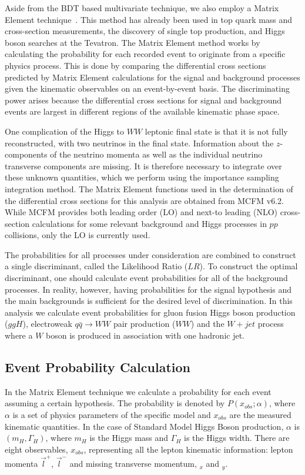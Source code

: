 Aside from the BDT based multivariate technique, we also employ a Matrix Element technique~\cite{MENote}. 
This method has already been used in top quark mass and cross-section 
measurements, the discovery of single top production, and Higgs boson searches at the Tevatron.  
The Matrix Element method works by calculating the probability for each recorded
event to originate from a specific physics process.
This is done by comparing the differential cross sections predicted by Matrix Element 
calculations for the signal and background processes given the kinematic observables
on an event-by-event basis.
The discriminating power arises because the differential cross sections for 
signal and background events are largest in different regions of the available
kinematic phase space. 

One complication of the Higgs to $WW$ leptonic final state is that it is not fully 
reconstructed, with two neutrinos in the final state. 
Information about the $z$-components of the neutrino momenta as well as the individual 
neutrino transverse components are missing. It is therefore necessary to integrate 
over these unknown quantities, which we perform using the importance sampling 
integration method.
The Matrix Element functions used in the determination of the differential cross sections
for this analysis are obtained from  MCFM v6.2.  While MCFM 
provides both leading order (LO) and next-to leading (NLO) cross-section calculations for 
some relevant background and Higgs processes in $pp$ collisions, only the
LO is currently used.

The probabilities for all processes under consideration are combined 
to construct a single discriminant, called the Likelihood Ratio ($LR$).  
To construct the optimal discriminant, one should calculate 
event probabilities for all of the background processes. In reality, however, having 
probabilities for the signal hypothesis and the main backgrounds is sufficient for the 
desired level of discrimination. In this analysis we calculate event probabilities 
for gluon fusion Higgs boson production ($ggH$), electroweak $q\bar{q}\rightarrow WW$ pair 
production ($WW$) and the $W+jet$ process where a $W$ boson is produced in association with one hadronic jet. 


\subsection{Event Probability Calculation}

In the Matrix Element technique we calculate a probability  for each event assuming a
certain hypothesis.  The probability is denoted by $P(x_{obs};\alpha)$,
where $\alpha$ is a set of physics 
parameters of the specific model and $x_{obs}$ are the measured kinematic quantities.
In the case of Standard Model Higgs Boson production,
 $\alpha$ is $(m_H, \Gamma_H)$, where  $m_H$ is the Higgs mass 
and $\Gamma_H$ is the Higgs width. There are eight observables, $x_{obs}$, representing all the 
lepton kinematic information: lepton momenta $\vec{l}^+$, $\vec{l}^-$ and missing 
transverse momentum, \met$_x$ and \met$_y$.

